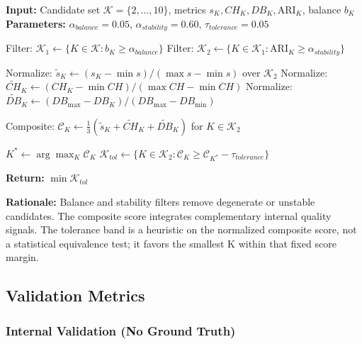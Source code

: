 \documentclass[11pt,a4paper]{article}
\begin{document}
\begin{algorithm}[h]
\caption{Evidence-Based K Selection}
\label{alg:kselection}
\begin{algorithmic}[1]
\State \textbf{Input:} Candidate set $\mathcal{K} = \{2, \ldots, 10\}$, metrics $s_K, CH_K, DB_K, \text{ARI}_K$, balance $b_K$
\State \textbf{Parameters:} $\alpha_{balance} = 0.05$, $\alpha_{stability} = 0.60$, $\tau_{tolerance} = 0.05$

\State Filter: $\mathcal{K}_1 \leftarrow \{K \in \mathcal{K} : b_K \geq \alpha_{balance}\}$ 
\State Filter: $\mathcal{K}_2 \leftarrow \{K \in \mathcal{K}_1 : \text{ARI}_K \geq \alpha_{stability}\}$ 

\State Normalize: $\tilde{s}_K \leftarrow (s_K - \min s) / (\max s - \min s)$ over $\mathcal{K}_2$
\State Normalize: $\tilde{CH}_K \leftarrow (CH_K - \min CH) / (\max CH - \min CH)$
\State Normalize: $\tilde{DB}_K \leftarrow (DB_{\max} - DB_K) / (DB_{\max} - DB_{\min})$ 

\State Composite: $\mathcal{C}_K \leftarrow \frac{1}{3}(\tilde{s}_K + \tilde{CH}_K + \tilde{DB}_K)$ for $K \in \mathcal{K}_2$

\State $K^* \leftarrow \arg\max_{K} \mathcal{C}_K$
\State $\mathcal{K}_{tol} \leftarrow \{K \in \mathcal{K}_2 : \mathcal{C}_K \geq \mathcal{C}_{K^*} - \tau_{tolerance}\}$ 

\State \textbf{Return:} $\min \mathcal{K}_{tol}$ 
\end{algorithmic}
\end{algorithm}

\textbf{Rationale:} Balance and stability filters remove degenerate or unstable candidates. The composite score integrates complementary internal quality signals. The tolerance band is a heuristic on the normalized composite score, not a statistical equivalence test; it favors the smallest K within that fixed score margin.

\subsection{Validation Metrics}
\label{sec:validation}

\subsubsection{Internal Validation (No Ground Truth)}
\end{document}
